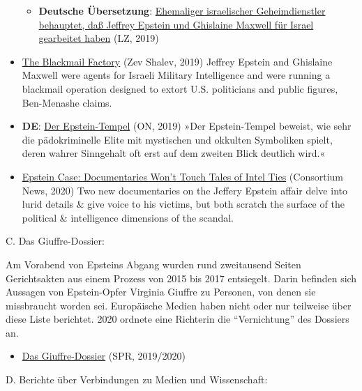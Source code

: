 \begin{itemize}
  \begin{itemize}
  \tightlist
  \item
    \textbf{Deutsche Übersetzung}:
    \href{https://linkezeitung.de/2019/10/14/ehemaliger-israelischer-geheimdienstler-behauptet-dass-jeffrey-epstein-und-ghislaine-maxwell-fuer-israel-gearbeitet-haben/}{Ehemaliger
    israelischer Geheimdienstler behauptet, daß Jeffrey Epstein und
    Ghislaine Maxwell für Israel gearbeitet haben} (LZ, 2019)
  \end{itemize}
\item
  \href{https://narativ.org/2019/09/26/blackmailing-america/}{The
  Blackmail Factory} (Zev Shalev, 2019) Jeffrey Epstein and Ghislaine
  Maxwell were agents for Israeli Military Intelligence and were running
  a blackmail operation designed to extort U.S. politicians and public
  figures, Ben-Menashe claims.
\item
  \textbf{DE}:
  \href{https://olivernevermind.wordpress.com/2019/08/12/der-epstein-tempel/}{Der
  Epstein-Tempel} (ON, 2019) »Der Epstein-Tempel beweist, wie sehr die
  pädokriminelle Elite mit mystischen und okkulten Symboliken spielt,
  deren wahrer Sinngehalt oft erst auf dem zweiten Blick deutlich wird.«
\item
  \href{https://consortiumnews.com/2020/06/18/epstein-case-documentaries-wont-touch-tales-of-intel-ties/}{Epstein
  Case: Documentaries Won't Touch Tales of Intel Ties} (Consortium News,
  2020) Two new documentaries on the Jeffery Epstein affair delve into
  lurid details \& give voice to his victims, but both scratch the
  surface of the political \& intelligence dimensions of the scandal.
\end{itemize}

C. Das Giuffre-Dossier:

Am Vorabend von Epsteins Abgang wurden rund zweitausend Seiten
Gerichtsakten aus einem Prozess von 2015 bis 2017 entsiegelt. Darin
befinden sich Aussagen von Epstein-Opfer Virginia Giuffre zu Personen,
von denen sie missbraucht worden sei. Europäische Medien haben nicht
oder nur teilweise über diese Liste berichtet. 2020 ordnete eine
Richterin die ``Vernichtung'' des Dossiers an.

\begin{itemize}
\tightlist
\item
  \href{https://swprs.org/das-giuffre-dossier/}{Das Giuffre-Dossier}
  (SPR, 2019/2020)
\end{itemize}

D. Berichte über Verbindungen zu Medien und Wissenschaft:

